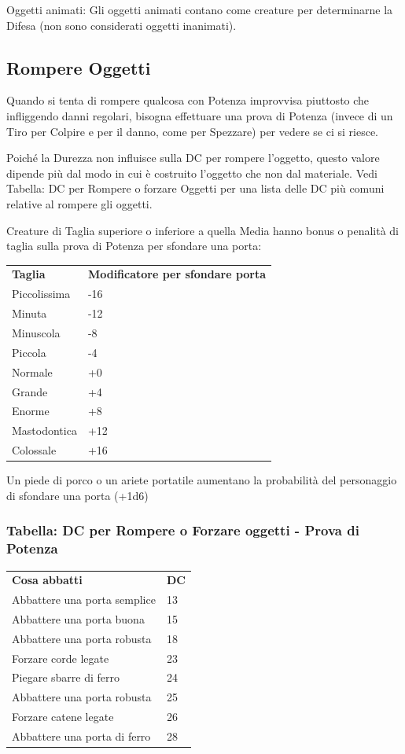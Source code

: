 \documentclass[a4paper,11pt,twoside,openany]{book}
\begin{document}
{Oggetti animati: Gli oggetti animati contano come creature per determinarne la Difesa (non sono considerati oggetti inanimati).

\subsection{Rompere Oggetti}

\label{rompere-oggetti}

Quando si tenta di rompere qualcosa con Potenza improvvisa piuttosto che infliggendo danni regolari, bisogna effettuare una prova di Potenza (invece di un Tiro per Colpire e per il danno, come per Spezzare) per vedere se ci si riesce. 

Poiché la Durezza non influisce sulla DC per rompere l'oggetto, questo valore dipende più dal modo in cui è costruito l'oggetto che non dal materiale. Vedi Tabella: DC per Rompere o forzare Oggetti per una lista delle DC più comuni relative al rompere gli oggetti.

Creature di Taglia superiore o inferiore a quella Media hanno bonus o penalità di taglia sulla prova di Potenza per sfondare una porta:

\bigskip

\begin{tabular}{ll}
\toprule
\textbf{Taglia} & \textbf{Modificatore per sfondare porta}\tabularnewline
Piccolissima & -16\tabularnewline
Minuta & -12\tabularnewline
Minuscola & -8\tabularnewline
Piccola & -4\tabularnewline
Normale & +0\tabularnewline
Grande & +4\tabularnewline
Enorme & +8\tabularnewline
Mastodontica & +12\tabularnewline
Colossale & +16\tabularnewline
\end{tabular}

\bigskip

Un piede di porco o un ariete portatile aumentano la probabilità del personaggio di sfondare una porta (+1d6)

\subsubsection{Tabella: DC per Rompere o Forzare oggetti - Prova di Potenza}

\label{tabella-dc-per-rompere-o-forzare-oggetti---prova-di-potenza}
\bigskip

\begin{tabular}{ll}
\toprule
\textbf{Cosa abbatti} & \textbf{DC}\tabularnewline
Abbattere una porta semplice & 13\tabularnewline
Abbattere una porta buona & 15\tabularnewline
Abbattere una porta robusta & 18\tabularnewline
Forzare corde legate & 23\tabularnewline
Piegare sbarre di ferro & 24\tabularnewline
Abbattere una porta robusta & 25\tabularnewline
Forzare catene legate & 26\tabularnewline
Abbattere una porta di ferro & 28\tabularnewline
\end{tabular}
\bigskip

}
\end{document}
